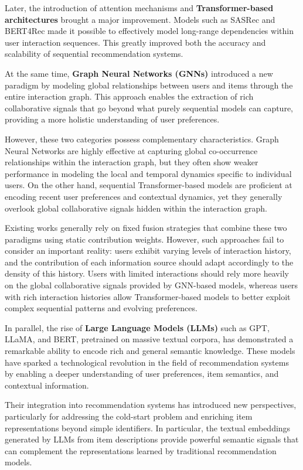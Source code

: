 \documentclass[12pt,a4paper]{report}
\begin{document}
Later, the introduction of attention mechanisms and \textbf{Transformer-based
architectures} brought a major improvement. Models such as SASRec and BERT4Rec made
it possible to effectively model long-range dependencies within user interaction
sequences. This greatly improved both the accuracy and scalability of sequential
recommendation systems.

At the same time, \textbf{Graph Neural Networks (GNNs)} introduced a new paradigm
by modeling global relationships between users and items through the entire
interaction graph. This approach enables the extraction of rich collaborative signals
that go beyond what purely sequential models can capture, providing a more holistic
understanding of user preferences.

However, these two categories possess complementary characteristics. Graph Neural
Networks are highly effective at capturing global co-occurrence relationships within
the interaction graph, but they often show weaker performance in modeling the local
and temporal dynamics specific to individual users. On the other hand, sequential
Transformer-based models are proficient at encoding recent user preferences and
contextual dynamics, yet they generally overlook global collaborative signals hidden
within the interaction graph.

Existing works generally rely on fixed fusion strategies that combine these two
paradigms using static contribution weights. However, such approaches fail to
consider an important reality: users exhibit varying levels of interaction history,
and the contribution of each information source should adapt accordingly to the
density of this history. Users with limited interactions should rely more heavily
on the global collaborative signals provided by GNN-based models, whereas users
with rich interaction histories allow Transformer-based models to better exploit
complex sequential patterns and evolving preferences.

In parallel, the rise of \textbf{Large Language Models (LLMs)} such as GPT, LLaMA,
and BERT, pretrained on massive textual corpora, has demonstrated a remarkable
ability to encode rich and general semantic knowledge. These models have sparked a
technological revolution in the field of recommendation systems by enabling a deeper
understanding of user preferences, item semantics, and contextual information.

Their integration into recommendation systems has introduced new perspectives,
particularly for addressing the cold-start problem and enriching item representations
beyond simple identifiers. In particular, the textual embeddings generated by LLMs
from item descriptions provide powerful semantic signals that can complement the
representations learned by traditional recommendation models.
\end{document}
